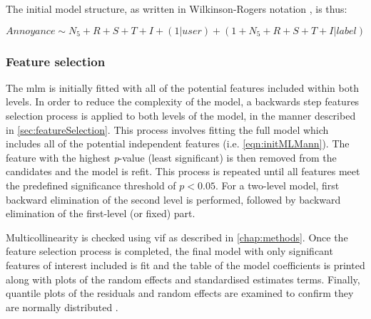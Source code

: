 The initial model structure, as written in Wilkinson-Rogers notation \citep{Wilkinson1973Symbolic}, is thus:

\begin{equation}
  \label{eqn:initMLMann}
      Annoyance \sim N_5 + R + S + T + I + (1 | user) + (1 + N_5 + R + S + T + I | label)
  \end{equation}

\subsubsection{Feature selection}

The \gls{mlm} is initially fitted with all of the potential features included within both levels. In order to reduce the complexity of the model, a backwards step features selection process is applied to both levels of the model, in the manner described in \cref{sec:featureSelection}. This process involves fitting the full model which includes all of the potential independent features (i.e. \cref{eqn:initMLMann}). The feature with the highest \emph{p}-value (least significant)\footnotemark{} is then removed from the candidates and the model is refit. This process is repeated until all features meet the predefined significance threshold of $p < 0.05 $. For a two-level model, first backward elimination of the second level is performed, followed by backward elimination of the first-level (or fixed) part. 



Multicollinearity is checked using \gls{vif} as described in \cref{chap:methods}. Once the feature selection process is completed, the final model with only significant features of interest included is fit and the table of the model coefficients is printed along with plots of the random effects and standardised estimates terms. Finally, quantile plots of the residuals and random effects are examined to confirm they are normally distributed \citep{Harrison2018brief}.

